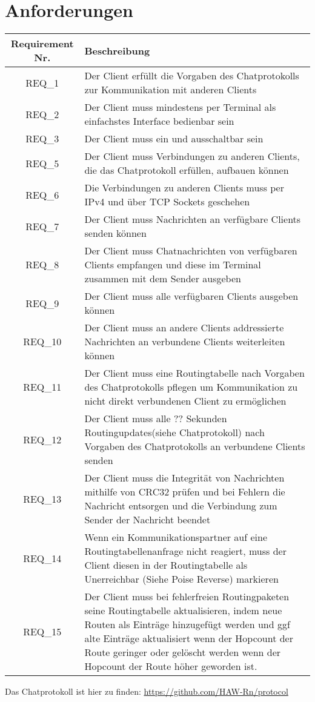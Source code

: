\section{Anforderungen}

\begin{tabular}{|c|p{13.5cm}|}
\hline
Requirement Nr. & Beschreibung
\\ \hline

REQ\_1 & Der Client erfüllt die Vorgaben des Chatprotokolls zur Kommunikation mit anderen Clients\\
\hline
REQ\_2 & Der Client muss mindestens per Terminal als einfachstes Interface bedienbar sein \\
\hline
REQ\_3 & Der Client muss ein\- und ausschaltbar sein\\
\hline
REQ\_5 & Der Client muss Verbindungen zu anderen Clients, die das Chatprotokoll erfüllen, aufbauen können\\
\hline
REQ\_6 & Die Verbindungen zu anderen Clients muss per IPv4 und über TCP Sockets geschehen\\
\hline
REQ\_7 & Der Client muss Nachrichten an verfügbare Clients senden können\\
\hline
REQ\_8 & Der Client muss Chatnachrichten von verfügbaren Clients empfangen und diese im Terminal zusammen mit dem Sender ausgeben\\
\hline
REQ\_9 & Der Client muss alle verfügbaren Clients ausgeben können\\
\hline
REQ\_10 & Der Client muss an andere Clients addressierte Nachrichten an verbundene Clients weiterleiten können\\
\hline
REQ\_11 & Der Client muss eine Routingtabelle nach Vorgaben des Chatprotokolls pflegen um Kommunikation zu nicht direkt verbundenen Client zu ermöglichen\\
\hline
REQ\_12 & Der Client muss alle ?? Sekunden Routingupdates(siehe Chatprotokoll) nach Vorgaben des Chatprotokolls an verbundene Clients senden\\
\hline
REQ\_13 & Der Client muss die Integrität von Nachrichten mithilfe von CRC32 prüfen und bei Fehlern die Nachricht entsorgen und die Verbindung zum Sender der Nachricht beendet\\
\hline
REQ\_14 & Wenn ein Kommunikationspartner auf eine Routingtabellenanfrage nicht reagiert, muss der Client diesen in der Routingtabelle als Unerreichbar (Siehe Poise Reverse) markieren\\
\hline
REQ\_15 & Der Client muss bei fehlerfreien Routingpaketen seine Routingtabelle aktualisieren, indem neue Routen als Einträge hinzugefügt werden und ggf alte Einträge aktualisiert wenn der Hopcount der Route geringer oder gelöscht werden wenn der Hopcount der Route höher geworden ist.\\
\hline
\end{tabular}
Das Chatprotokoll ist hier zu finden: \url{https://github.com/HAW-Rn/protocol}

